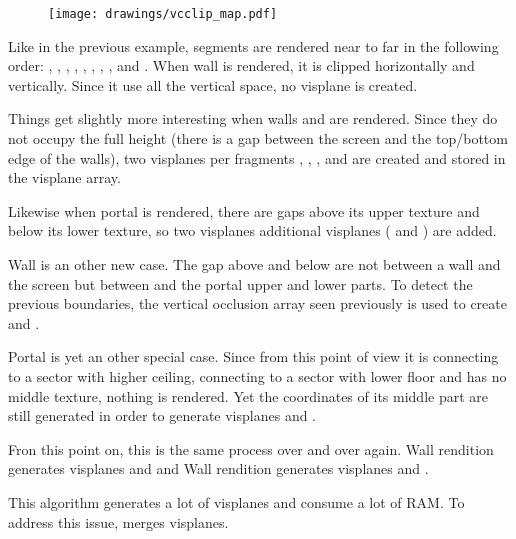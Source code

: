 \begin{figure}
\centering
\texttt{[image: drawings/vcclip\_map.pdf]}
\end{figure}
Like in the previous example, segments are rendered near to far in the following order: , , , , , , , , and .
When wall  is rendered, it is clipped horizontally and vertically. Since it use all the vertical space, no visplane is created.\\
\par
 Things get slightly more interesting when walls  and  are rendered. Since they do not occupy the full height (there is a gap between the screen and the top/bottom edge of the walls), two visplanes per fragments , , , and  are created and stored in the visplane array.\\
 \par
  Likewise when portal  is rendered, there are gaps above its upper texture and below its lower texture, so two visplanes additional visplanes ( and ) are added.\\
\par
Wall  is an other new case. The gap above and below are not between a wall and the screen but between   and the portal  upper and lower parts. To detect the previous boundaries, the vertical occlusion array seen previously is used to create  and  .\\
\par
Portal  is yet an other special case. Since from this point of view it is connecting to a sector with higher ceiling, connecting to a sector with lower floor and has no middle texture, nothing is rendered. Yet the coordinates of its middle part are still generated in order to generate visplanes  and  .\\
\par
Fron this point on, this is the same process over and over again. Wall  rendition generates visplanes  and   and Wall  rendition generates visplanes  and  .\\
\par
This algorithm generates a lot of visplanes and consume a lot of RAM. To address this issue, \doom merges visplanes.









